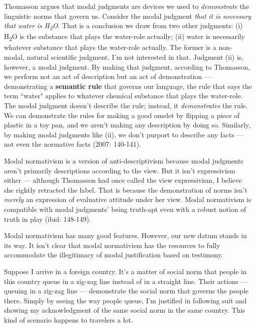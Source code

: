 \documentclass[a4paper,12pt]{article}
\begin{document}
Thomasson argues that modal judgments are devices we used to \emph{demonstrate} the linguistic norms that govern us. Consider the modal judgment \emph{that it is necessary that water is H\textsubscript{2}O}. That is a conclusion we draw from two other judgments: (i) H\textsubscript{2}O is the substance that plays the water-role actually; (ii) water is necessarily whatever substance that plays the water-role actually. The former is a non-modal, natural scientific judgment. I'm not interested in that. Judgment (ii) is, however, a modal judgment. By making that judgment, according to Thomasson, we perform not an act of description but an act of demonstration --- demonstrating a \textbf{semantic rule} that governs our language, the rule that says the term ``water" applies to whatever chemical substance that plays the water-role. The modal judgment doesn't describe the rule; instead, it \emph{demonstrates} the rule. We can demonstrate the rules for making a good omelet by flipping a piece of plastic in a toy pan, and we aren't making any description by doing so. Similarly, by making modal judgments like (ii), we don't purport to describe any facts --- not even the normative facts (2007: 140-141).

Modal normativism is a version of anti-descriptivism because modal judgments aren't primarily descriptions according to the view. But it isn't expressivism either --- although Thomasson had once called the view expressivism, I believe she rightly retracted the label. That is because the demonstration of norms isn't \emph{merely} an expression of evaluative attitude under her view. Modal normativism is compatible with modal judgments' being truth-apt even with a robust notion of truth in play (ibid: 148-149).\footnotemark


Modal normativism has many good features. However, our new datum stands in its way. It isn't clear that modal normativism has the resources to fully accommodate the illegitimacy of modal justification based on testimony.

Suppose I arrive in a foreign country. It's a matter of social norm that people in this country queue in a zig-zag line instead of in a straight line. Their actions --- queuing in a zig-zag line --- demonstrate the social norm that governs the people there. Simply by seeing the way people queue, I'm justified in following suit and showing my acknowledgment of the same social norm in the same country. This kind of scenario happens to travelers a lot.
\end{document}
